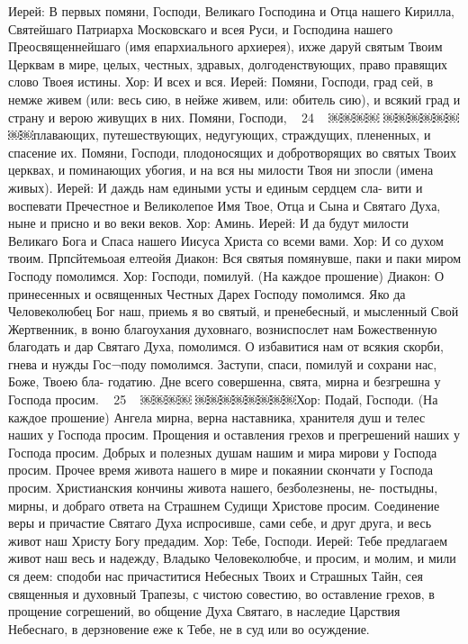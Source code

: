 Иерей: В первых помяни, Господи, Великаго Господина и Отца нашего Кирилла, Святейшаго Патриарха Московскаго и всея Руси, и Господина нашего Преосвященнейшаго (имя епархиального архиерея), ихже даруй святым Твоим Церквам в мире, целых, честных, здравых, долгоденствующих, право правящих слово Твоея истины.
Хор: И всех и вся.
Иерей: Помяни, Господи, град сей, в немже живем (или: весь сию, в нейже живем, или:
обитель сию), и всякий град и страну и верою живущих в них. Помяни, Господи, ~ 24 ~
￼￼￼￼
￼￼￼￼￼￼￼￼плавающих, путешествующих, недугующих, страждущих, плененных, и спасение их. Помяни, Господи, плодоносящих и добротворящих во святых Твоих церквах, и поминающих убогия, и на вся ны милости Твоя ни зпосли (имена живых).
Иерей: И даждь нам едиными усты и единым сердцем сла- вити и воспевати Пречестное и Великолепое Имя Твое, Отца и Сына и Святаго Духа, ныне и присно и во веки веков.
Хор: Аминь.
Иерей: И да будут милости Великаго Бога и Спаса нашего
Иисуса Христа со всеми вами. Хор: И со духом твоим.
Прпсйтемьоая елтеойя
Диакон: Вся святыя помянувше, паки и паки миром Господу помолимся.
Хор: Господи, помилуй. (На каждое прошение)
Диакон: О принесенных и освященных Честных Дарех Господу помолимся.
Яко да Человеколюбец Бог наш, приемь я во святый, и пренебесный, и мысленный Свой Жертвенник, в воню благоухания духовнаго, возниспослет нам Божественную благодать и дар Святаго Духа, помолимся.
О избавитися нам от всякия скорби, гнева и нужды Гос¬поду помолимся.
Заступи, спаси, помилуй и сохрани нас, Боже, Твоею бла- годатию.
Дне всего совершенна, свята, мирна и безгрешна у Господа просим.
~ 25 ~
￼￼￼￼
￼￼￼￼￼￼￼￼Хор: Подай, Господи. (На каждое прошение)
Ангела мирна, верна наставника, хранителя душ и телес наших у Господа просим.
Прощения и оставления грехов и прегрешений наших у Господа просим.
Добрых и полезных душам нашим и мира мирови у Господа просим.
Прочее время живота нашего в мире и покаянии скончати у Господа просим.
Христианския кончины живота нашего, безболезнены, не- постыдны, мирны, и добраго ответа на Страшнем Судищи Христове просим.
Соединение веры и причастие Святаго Духа испросивше, сами себе, и друг друга, и весь живот наш Христу Богу предадим.
Хор: Тебе, Господи.
Иерей: Тебе предлагаем живот наш весь и надежду, Владыко Человеколюбче, и просим, и молим, и мили ся деем: сподоби нас причаститися Небесных Твоих и Страшных Тайн, сея священныя и духовный Трапезы, с чистою совестию, во оставление грехов, в прощение согрешений, во общение Духа Святаго, в наследие Царствия Небеснаго, в дерзновение еже к Тебе, не в суд или во осуждение.
